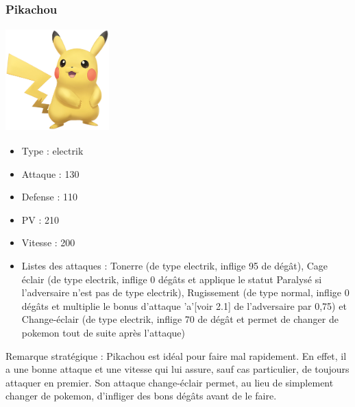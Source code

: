 		\subsubsection{Pikachou}
            \begin{center}
				\includegraphics[width=4cm,height=4cm]{images/pikachou}
			\end{center}
			\begin{itemize}
				\item Type : electrik
				\item Attaque : 130
				\item Defense : 110
				\item PV : 210
				\item Vitesse : 200
				\item Listes des attaques : Tonerre (de type electrik, inflige 95 de dégât), Cage éclair (de type electrik, inflige 0 dégâts et applique le statut Paralysé si l'adversaire n'est pas de type electrik), Rugissement (de type normal, inflige 0 dégâts et multiplie le bonus d'attaque 'a'[voir 2.1] de l'adversaire par 0,75) et Change-éclair (de type electrik, inflige 70 de dégât et permet de changer de pokemon tout de suite après l'attaque)
			\end{itemize}
			Remarque stratégique : Pikachou est idéal pour faire mal rapidement. En effet, il a une bonne attaque et une vitesse qui lui assure, sauf cas particulier, de toujours attaquer en premier. Son attaque change-éclair permet, au lieu de simplement changer de pokemon, d'infliger des bons dégâts avant de le faire.
